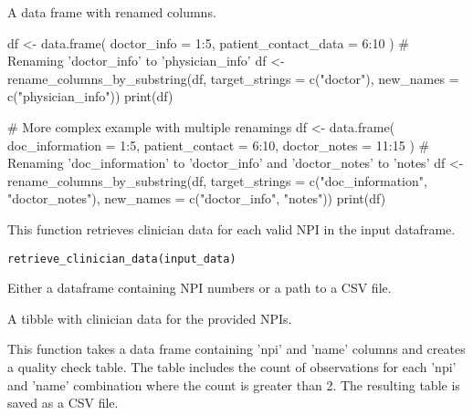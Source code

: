 \documentclass[a4paper]{book}
\begin{document}
%
\begin{Value}
A data frame with renamed columns.
\end{Value}
%
\begin{Examples}
\begin{ExampleCode}
df <- data.frame(
  doctor_info = 1:5,
  patient_contact_data = 6:10
)
# Renaming 'doctor_info' to 'physician_info'
df <- rename_columns_by_substring(df,
                                  target_strings = c("doctor"),
                                  new_names = c("physician_info"))
print(df)

# More complex example with multiple renamings
df <- data.frame(
  doc_information = 1:5,
  patient_contact = 6:10,
  doctor_notes = 11:15
)
# Renaming 'doc_information' to 'doctor_info' and 'doctor_notes' to 'notes'
df <- rename_columns_by_substring(df,
                                  target_strings = c("doc_information", "doctor_notes"),
                                  new_names = c("doctor_info", "notes"))
print(df)
\end{ExampleCode}
\end{Examples}
%
\begin{Description}
This function retrieves clinician data for each valid NPI in the input dataframe.
\end{Description}
%
\begin{Usage}
\begin{verbatim}
retrieve_clinician_data(input_data)
\end{verbatim}
\end{Usage}
%
\begin{Arguments}
\begin{ldescription}
\item[\code{input\_data}] Either a dataframe containing NPI numbers or a path to a CSV file.
\end{ldescription}
\end{Arguments}
%
\begin{Value}
A tibble with clinician data for the provided NPIs.
\end{Value}
%
\begin{Description}
This function takes a data frame containing 'npi' and 'name' columns and creates a quality check table.
The table includes the count of observations for each 'npi' and 'name' combination where the count is greater than 2.
The resulting table is saved as a CSV file.
\end{Description}
\end{document}
